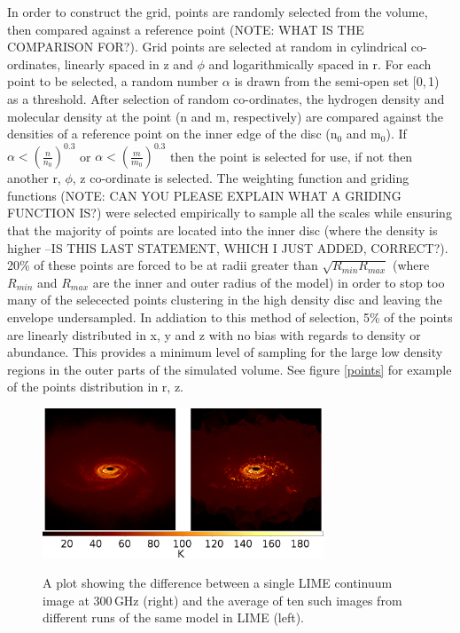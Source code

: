 \documentclass[useAMS,usenatbib]{mn2e}
\begin{document}
In order to construct the grid, points are randomly selected from the volume, then compared against a reference point (NOTE: WHAT IS THE COMPARISON FOR?). Grid points are selected at random in cylindrical co-ordinates, linearly spaced in z and $\phi$ and logarithmically spaced in r. For each point to be selected, a random number $\alpha$ is drawn from the semi-open set [0,$\,$1) as a threshold. After selection of random co-ordinates, the hydrogen density and molecular density at the point (n and m, respectively) are compared against the densities of a reference point on the inner edge of the disc (n$_0$ and m$_0$). If $\alpha<\left( \frac{n}{n_0} \right)^{0.3}$ or $\alpha< \left( \frac{m}{m_0} \right)^{0.3}$ then the point is selected for use, if not then another r, $\phi$, z co-ordinate is selected. The weighting function and griding functions (NOTE: CAN YOU PLEASE EXPLAIN WHAT A GRIDING FUNCTION IS?) were selected empirically to sample all the scales while ensuring that the majority of points are located into the inner disc (where the density is higher --IS THIS LAST STATEMENT, WHICH I JUST ADDED, CORRECT?). 20\% of these points are forced to be at radii greater than $\sqrt{R_{min}R_{max}}$ (where $R_{min}$ and $R_{max}$ are the inner and outer radius of the model) in order to stop too many of the selecected points clustering in the high density disc and leaving the envelope undersampled. In addiation to this method of selection, 5\% of the points are linearly distributed in x, y and z with no bias with regards to density or abundance. This provides a minimum level of sampling for the large low density regions in the outer parts of the simulated volume. See figure \ref{points} for example of the points distribution in r, z. \newline

\begin{figure}
 \includegraphics[width=84mm]{Figures/sim/average_comparison.png}
 \label{averages}
 \caption{A plot showing the difference between a single LIME continuum image at 300$\,$GHz (right) and the average of ten such images from different runs of the same model in LIME (left).}
\end{figure}
\end{document}

